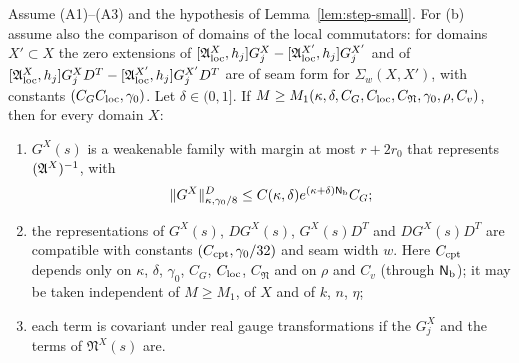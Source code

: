 \begin{theorem}\label{thm:weak-inverse}
Assume (A1)--(A3) and the hypothesis of Lemma~\ref{lem:step-small}. For (b) assume also the comparison of domains of the local commutators: for domains $X'\subset X$ the zero extensions of $[\mathfrak A^X_{\rm loc},h_j]G^X_j-[\mathfrak A^{X'}_{\rm loc},h_j]G^{X'}_j$ and of $[\mathfrak A^X_{\rm loc},h_j]G^X_jD^T-[\mathfrak A^{X'}_{\rm loc},h_j]G^{X'}_jD^T$ are of seam form for $\Sigma_w(X,X')$, with constants $(C_GC_{\rm loc},\gamma_0)$. Let $\delta\in(0,1]$. If $M\ge M_1(\kappa,\delta,C_G,C_{\rm loc},C_{\mathfrak N},\gamma_0,\rho,C_v)$, then for every domain $X$:
\begin{enumerate}[label=(\alph*)]
\item $G^X(s)$ is a weakenable family with margin at most $r+2r_0$ that represents $(\mathfrak A^X)^{-1}$, with
\[
\|G^X\|^D_{\kappa,\gamma_0/8}\le C(\kappa,\delta)e^{(\kappa+\delta)\mathsf N_{\rm b}}C_G ;
\]
\item the representations of $G^X(s)$, $DG^X(s)$, $G^X(s)D^T$ and $DG^X(s)D^T$ are compatible with constants $(C_{\rm cpt},\gamma_0/32)$ and seam width $w$. Here $C_{\rm cpt}$ depends only on $\kappa$, $\delta$, $\gamma_0$, $C_G$, $C_{\rm loc}$, $C_{\mathfrak N}$ and on $\rho$ and $C_v$ (through $\mathsf N_{\rm b}$); it may be taken independent of $M\ge M_1$, of $X$ and of $k$, $n$, $\eta$;
\item each term is covariant under real gauge transformations if the $G^X_j$ and the terms of $\mathfrak N^X(s)$ are.
\end{enumerate}
\end{theorem}

